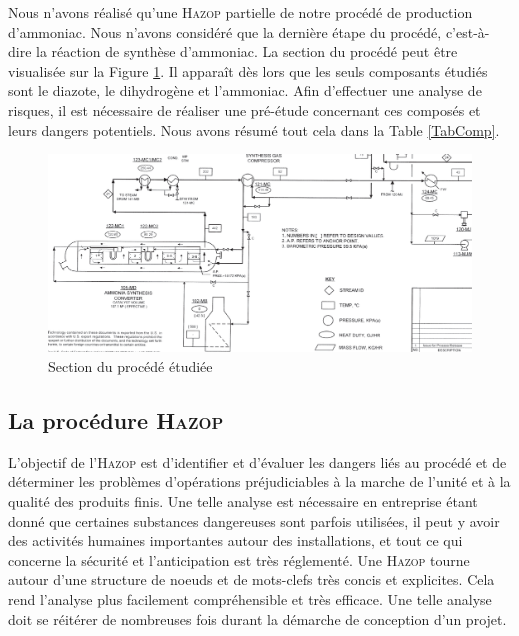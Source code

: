 Nous n'avons réalisé qu'une \textsc{Hazop} partielle de notre procédé de production d'ammoniac. Nous n'avons considéré 
que la dernière étape du procédé, c'est-à-dire la réaction de synthèse d'ammoniac. La section du procédé peut être visualisée 
sur la Figure \ref{section_procede}. Il apparaît dès lors que les seuls composants étudiés sont le diazote, le dihydrogène 
et l'ammoniac. Afin d'effectuer une analyse de risques, il est nécessaire de réaliser une pré-étude concernant ces composés 
et leurs dangers potentiels. Nous avons résumé tout cela dans la Table \ref{TabComp}.\cite{CSST}\cite{Ontario}

\begin{figure}[ht!]
 \centering
 \includegraphics[scale=0.3]{section_procede.PNG}
 \caption{Section du procédé étudiée}
 \label{section_procede}
\end{figure}

\subsection{La procédure \textsc{Hazop}}

L’objectif de l’\textsc{Hazop} est d’identifier et d’évaluer les dangers liés au procédé et de déterminer les problèmes 
d’opérations préjudiciables à la marche de l’unité et à la qualité des produits finis. Une telle analyse est nécessaire 
en entreprise étant donné que certaines substances dangereuses sont parfois utilisées, il peut y avoir des activités 
humaines importantes autour des installations, et tout ce qui concerne la sécurité et l'anticipation est très réglementé.
Une \textsc{Hazop} tourne autour d'une structure de noeuds et de mots-clefs très concis et explicites. Cela rend l'analyse 
plus facilement compréhensible et très efficace.
Une telle analyse doit se réitérer de nombreuses fois durant la démarche de conception d'un projet.\cite{icamp}

